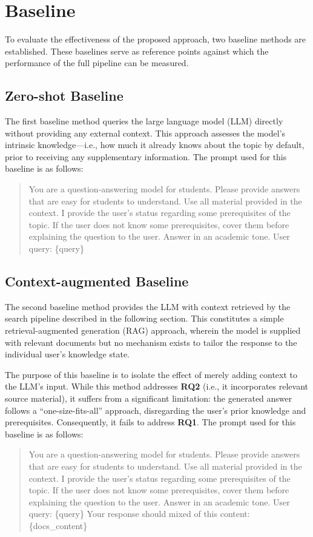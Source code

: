 \section{Baseline}

To evaluate the effectiveness of the proposed approach, two baseline methods are established. These baselines serve as reference points against which the performance of the full pipeline can be measured.

\subsection{Zero-shot Baseline}
\label{method:zero-shot-baseline}
The first baseline method queries the large language model (LLM) directly without providing any external context. This approach assesses the model's intrinsic knowledge---i.e., how much it already knows about the topic by default, prior to receiving any supplementary information. The prompt used for this baseline is as follows:

\begin{quote}
    You are a question-answering model for students. Please provide answers that are easy for students to understand. Use all material provided in the context.
    I provide the user's status regarding some prerequisites of the topic. If the user does not know some prerequisites, cover them before explaining the question to the user.
    Answer in an academic tone.
    User query:
    \{query\}
\end{quote}

\subsection{Context-augmented Baseline}
\label{method:context-augmented-baseline}
The second baseline method provides the LLM with context retrieved by the search pipeline described in the following section. This constitutes a simple retrieval-augmented generation (RAG) approach, wherein the model is supplied with relevant documents but no mechanism exists to tailor the response to the individual user's knowledge state.

The purpose of this baseline is to isolate the effect of merely adding context to the LLM's input. While this method addresses \textbf{RQ2} (i.e., it incorporates relevant source material), it suffers from a significant limitation: the generated answer follows a ``one-size-fits-all'' approach, disregarding the user's prior knowledge and prerequisites. Consequently, it fails to address \textbf{RQ1}. The prompt used for this baseline is as follows:

\begin{quote}
    You are a question-answering model for students. Please provide answers that are easy for students to understand. Use all material provided in the context.
    I provide the user's status regarding some prerequisites of the topic. If the user does not know some prerequisites, cover them before explaining the question to the user.
    Answer in an academic tone.
    User query:
    \{query\}
    Your response should mixed of this content:
    \{docs\_content\}
\end{quote}
